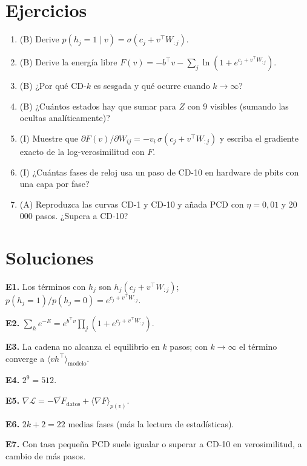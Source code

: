 \documentclass[11pt,a4paper]{article}
\begin{document}
\section{Ejercicios}
\begin{enumerate}[label=\textbf{E\arabic*.}]
\item (B) Derive $p(h_j=1\mid v)=\sigma(c_j+v^\top W_{:j})$.
\item (B) Derive la energía libre $F(v)=-b^\top v-\sum_j\ln(1+e^{c_j+v^\top W_{:j}})$.
\item (B) ¿Por qué CD-$k$ es sesgada y qué ocurre cuando $k\to\infty$?
\item (B) ¿Cuántos estados hay que sumar para $Z$ con 9 visibles (sumando las ocultas analíticamente)?
\item (I) Muestre que $\partial F(v)/\partial W_{ij}=-v_i\,\sigma(c_j+v^\top W_{:j})$ y escriba el gradiente exacto de la log-verosimilitud con $F$.
\item (I) ¿Cuántas fases de reloj usa un paso de CD-10 en hardware de pbits con una capa por fase?
\item (A) Reproduzca las curvas CD-1 y CD-10 y añada PCD con $\eta=0{,}01$ y 20\,000 pasos. ¿Supera a CD-10?
\end{enumerate}
\section{Soluciones}
\begin{solucion}
\textbf{E1.} Los términos con $h_j$ son $h_j(c_j+v^\top W_{:j})$; $p(h_j=1)/p(h_j=0)=e^{c_j+v^\top W_{:j}}$.

\textbf{E2.} $\sum_he^{-E}=e^{b^\top v}\prod_j(1+e^{c_j+v^\top W_{:j}})$.

\textbf{E3.} La cadena no alcanza el equilibrio en $k$ pasos; con $k\to\infty$ el término converge a $\langle vh^\top\rangle_{\text{modelo}}$.

\textbf{E4.} $2^9=512$.

\textbf{E5.} $\nabla\mathcal L=-\overline{\nabla F}_{\text{datos}}+\langle\nabla F\rangle_{p(v)}$.

\textbf{E6.} $2k+2=22$ medias fases (más la lectura de estadísticas).

\textbf{E7.} Con tasa pequeña PCD suele igualar o superar a CD-10 en verosimilitud, a cambio de más pasos.
\end{solucion}
\end{document}
